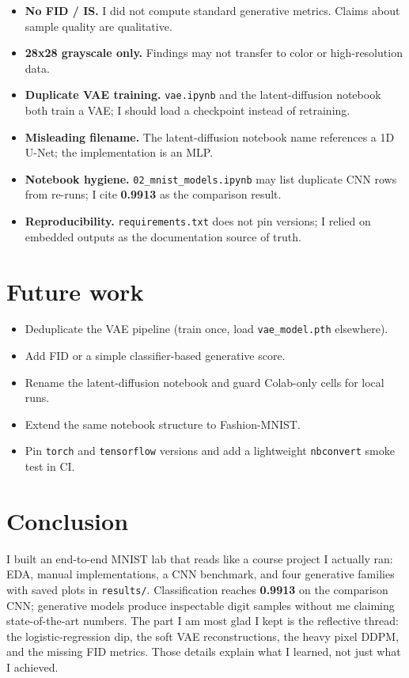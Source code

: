 \documentclass[11pt,a4paper]{article}
\begin{document}
\begin{itemize}[noitemsep]
  \item \textbf{No FID / IS.} I did not compute standard generative metrics. Claims about sample quality are qualitative.
  \item \textbf{28x28 grayscale only.} Findings may not transfer to color or high-resolution data.
  \item \textbf{Duplicate VAE training.} \texttt{vae.ipynb} and the latent-diffusion notebook both train a VAE; I should load a checkpoint instead of retraining.
  \item \textbf{Misleading filename.} The latent-diffusion notebook name references a 1D U-Net; the implementation is an MLP.
  \item \textbf{Notebook hygiene.} \texttt{02\_mnist\_models.ipynb} may list duplicate CNN rows from re-runs; I cite \textbf{0.9913} as the comparison result.
  \item \textbf{Reproducibility.} \texttt{requirements.txt} does not pin versions; I relied on embedded outputs as the documentation source of truth.
\end{itemize}

\section{Future work}

\begin{itemize}[noitemsep]
  \item Deduplicate the VAE pipeline (train once, load \texttt{vae\_model.pth} elsewhere).
  \item Add FID or a simple classifier-based generative score.
  \item Rename the latent-diffusion notebook and guard Colab-only cells for local runs.
  \item Extend the same notebook structure to Fashion-MNIST.
  \item Pin \texttt{torch} and \texttt{tensorflow} versions and add a lightweight \texttt{nbconvert} smoke test in CI.
\end{itemize}

\section{Conclusion}

I built an end-to-end MNIST lab that reads like a course project I actually ran: EDA, manual implementations, a CNN benchmark, and four generative families with saved plots in \texttt{results/}. Classification reaches \textbf{0.9913} on the comparison CNN; generative models produce inspectable digit samples without me claiming state-of-the-art numbers. The part I am most glad I kept is the reflective thread: the logistic-regression dip, the soft VAE reconstructions, the heavy pixel DDPM, and the missing FID metrics. Those details explain what I learned, not just what I achieved.



\end{document}
